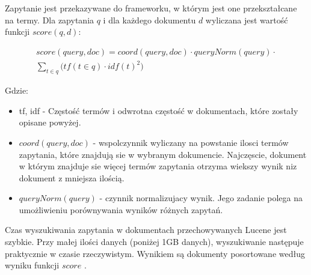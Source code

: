 Zapytanie jest przekazywane do frameworku, w którym jest one przekształcane na termy. Dla zapytania $q$ i dla każdego dokumentu $d$ wyliczana jest wartość funkcji $score(q,d)$:

\begin{equation}
\begin{split}
score(query,doc) = coord(query, doc) \cdot queryNorm(query) \cdot  \\
\sum_{t \in q} { \big( tf (t \in q) \cdot idf(t)^2 \big)}
\end{split}
\end{equation}


Gdzie:
\begin{itemize}
\item tf, idf - Częstość termów i odwrotna częstość w dokumentach, które zostały opisane powyżej.
\item $coord (query, doc)$ - wspolczynnik wyliczany na powstanie
ilosci termów zapytania, które znajdują sie w wybranym dokumencie.
Najczęscie, dokument w którym znajduje sie więcej termów zapytania
otrzyma wiekszy wynik niz dokument z mniejsza ilością.
\item $queryNorm(query)$ - czynnik normalizujacy wynik. Jego zadanie
polega na umożliwieniu porównywania wyników różnych zapytań.
\end{itemize}

Czas wyszukiwania zapytania w dokumentach przechowywanych Lucene jest szybkie. Przy małej ilości danych (poniżej 1GB danych), wyszukiwanie następuje praktycznie w czasie rzeczywistym. Wynikiem są dokumenty posortowane według wyniku funkcji $score$ \cite{lucene_scoring:online}.


